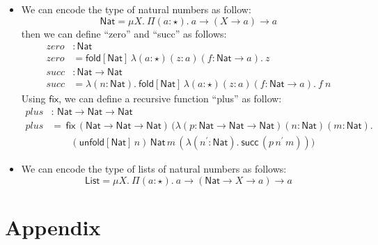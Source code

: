 \documentclass[oneside,a4paper]{article}
\numberwithin{equation}{section}
\newcommand{\fold}[2]{\mathsf{fold}[#1]\,#2}
\newcommand{\unfold}[2]{\mathsf{unfold}[#1]\,#2}
\begin{document}
\begin{itemize}
  \newcommand{\Nat}{\mathsf{Nat}}
  \newcommand{\List}{\mathsf{List}}
  \newcommand{\PlFunc}{\Nat\rightarrow\Nat\rightarrow\Nat}

\item We can encode the type of natural numbers as follow:
  \[
  \Nat = \mu X.\ \Pi(a : \star).\ a \rightarrow (X \rightarrow a)
  \rightarrow a
  \]
  then we can define ``zero'' and ``succ'' as follows:
  \begin{align*}
    zero &: \Nat \\
    zero &= \fold{\Nat}{\lambda (a : \star) (z : a) (f : \Nat
           \rightarrow a).\ z}\\
    succ &: \Nat \rightarrow \Nat\\
    succ &= \lambda (n : \Nat).\ \fold{\Nat}{\lambda (a : \star) (z : a)
           (f : \Nat \rightarrow a).\ f\ n}
  \end{align*}
  Using $\mathsf{fix}$, we can define a recursive function ``plus'' as
  follow:
  \begin{align*}
    plus &:\,\PlFunc\\
    plus &=\,\mathsf{fix}\,(\PlFunc)\,(\lambda(p : \PlFunc)(n :
            \Nat)(m : \Nat).\\
          &\qquad (\unfold{\Nat}{n})\,\Nat\,m\,(\lambda (n^{\prime} : \Nat).\ \mathsf{succ}\,
            (p\,n^{\prime}\,m)))
  \end{align*}
\item We can encode the type of lists of natural numbers as follows:
  \[
  \List = \mu X.\ \Pi(a : \star).\ a \rightarrow (\Nat \rightarrow X
  \rightarrow a)
  \rightarrow a
  \]
\end{itemize}


\nocite{*}  

\appendix
\section{Appendix}
\end{document}
